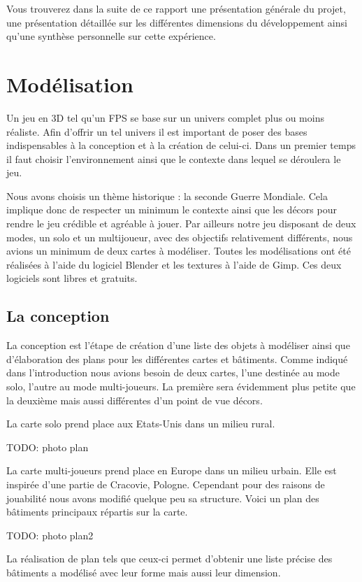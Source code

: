\documentclass[11pt]{report}
\begin{document}
Vous trouverez dans la suite de ce rapport une présentation générale du projet, une présentation détaillée sur les différentes dimensions du développement ainsi qu'une synthèse personnelle sur cette expérience.

\chapter{Modélisation}

Un jeu en 3D tel qu'un FPS se base sur un univers complet plus ou moins réaliste. Afin d'offrir un tel univers il est important de poser des bases indispensables à la conception et à la création de celui-ci. Dans un premier temps il faut choisir l’environnement ainsi que le contexte dans lequel se déroulera le jeu.

Nous avons choisis un thème historique : la seconde Guerre Mondiale. Cela implique donc de respecter un minimum le contexte ainsi que les décors pour rendre le jeu crédible et agréable à jouer. Par ailleurs notre jeu disposant de deux modes, un solo et un multijoueur, avec des objectifs relativement différents, nous avions un minimum de deux cartes à modéliser.  Toutes les modélisations ont été réalisées à l’aide du logiciel Blender et les textures à l’aide de Gimp.  Ces deux logiciels sont libres et gratuits.

\section{La conception}

La conception est l’étape de création d’une liste des objets à modéliser ainsi que d’élaboration des plans pour les différentes cartes et bâtiments. Comme indiqué dans l’introduction nous avions besoin de deux cartes, l’une destinée au mode solo, l’autre au mode multi-joueurs. La première sera évidemment plus petite que la deuxième mais aussi différentes d’un point de vue décors.

La carte solo prend place aux Etats-Unis dans un milieu rural. 

TODO: photo plan

La carte multi-joueurs prend place en Europe dans un milieu urbain. Elle est inspirée d’une partie de Cracovie, Pologne. Cependant pour des raisons de jouabilité nous avons modifié quelque peu sa structure. Voici un plan des bâtiments principaux répartis sur la carte.

TODO: photo plan2

La réalisation de plan tels que ceux-ci permet d’obtenir une liste précise des bâtiments a modélisé avec leur forme mais aussi leur dimension. 
\end{document}
